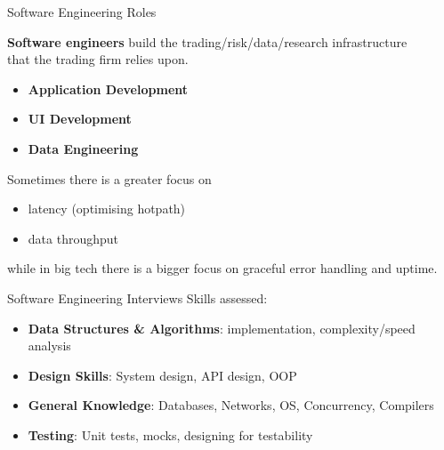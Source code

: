 \begin{frame}{Software Engineering Roles}
  \begin{sqt:definition}
    \textbf{Software engineers} build the trading/risk/data/research infrastructure \\
    that the trading firm relies upon.
  \end{sqt:definition}

  \begin{itemize}
    \item \textbf{Application Development}
    \item \textbf{UI Development}
    \item \textbf{Data Engineering}
  \end{itemize}

  Sometimes there is a greater focus on
  \begin{itemize}
    \item latency (optimising hotpath)
    \item data throughput
  \end{itemize}
  while in big tech there is a bigger focus on graceful error handling and uptime.
\end{frame}

\begin{frame}{Software Engineering Interviews}
  Skills assessed:
  \begin{itemize}
    \item \textbf{Data Structures \& Algorithms}: implementation, complexity/speed analysis
    \item \textbf{Design Skills}: System design, API design, OOP
    \item \textbf{General Knowledge}: Databases, Networks, OS, Concurrency, Compilers
    \item \textbf{Testing}: Unit tests, mocks, designing for testability
  \end{itemize}
\end{frame}

